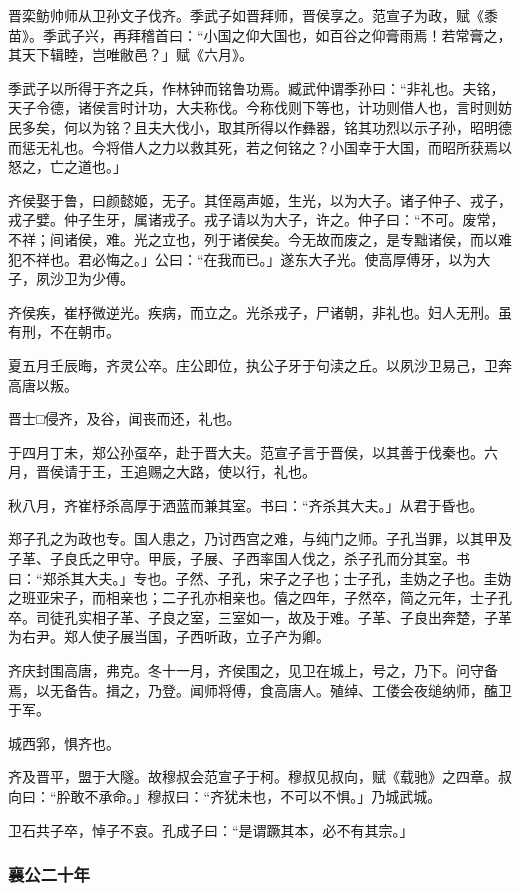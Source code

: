 \documentclass[]{article}
\begin{document}
晋栾鲂帅师从卫孙文子伐齐。季武子如晋拜师，晋侯享之。范宣子为政，赋《黍苗》。季武子兴，再拜稽首曰：``小国之仰大国也，如百谷之仰膏雨焉！若常膏之，其天下辑睦，岂唯敝邑？」赋《六月》。

季武子以所得于齐之兵，作林钟而铭鲁功焉。臧武仲谓季孙曰：``非礼也。夫铭，天子令德，诸侯言时计功，大夫称伐。今称伐则下等也，计功则借人也，言时则妨民多矣，何以为铭？且夫大伐小，取其所得以作彝器，铭其功烈以示子孙，昭明德而惩无礼也。今将借人之力以救其死，若之何铭之？小国幸于大国，而昭所获焉以怒之，亡之道也。」

齐侯娶于鲁，曰颜懿姬，无子。其侄鬲声姬，生光，以为大子。诸子仲子、戎子，戎子嬖。仲子生牙，属诸戎子。戎子请以为大子，许之。仲子曰：``不可。废常，不祥；间诸侯，难。光之立也，列于诸侯矣。今无故而废之，是专黜诸侯，而以难犯不祥也。君必悔之。」公曰：``在我而已。」遂东大子光。使高厚傅牙，以为大子，夙沙卫为少傅。

齐侯疾，崔杼微逆光。疾病，而立之。光杀戎子，尸诸朝，非礼也。妇人无刑。虽有刑，不在朝市。

夏五月壬辰晦，齐灵公卒。庄公即位，执公子牙于句渎之丘。以夙沙卫易己，卫奔高唐以叛。

晋士□侵齐，及谷，闻丧而还，礼也。

于四月丁未，郑公孙虿卒，赴于晋大夫。范宣子言于晋侯，以其善于伐秦也。六月，晋侯请于王，王追赐之大路，使以行，礼也。

秋八月，齐崔杼杀高厚于洒蓝而兼其室。书曰：``齐杀其大夫。」从君于昏也。

郑子孔之为政也专。国人患之，乃讨西宫之难，与纯门之师。子孔当罪，以其甲及子革、子良氏之甲守。甲辰，子展、子西率国人伐之，杀子孔而分其室。书曰：``郑杀其大夫。」专也。子然、子孔，宋子之子也；士子孔，圭妫之子也。圭妫之班亚宋子，而相亲也；二子孔亦相亲也。僖之四年，子然卒，简之元年，士子孔卒。司徒孔实相子革、子良之室，三室如一，故及于难。子革、子良出奔楚，子革为右尹。郑人使子展当国，子西听政，立子产为卿。

齐庆封围高唐，弗克。冬十一月，齐侯围之，见卫在城上，号之，乃下。问守备焉，以无备告。揖之，乃登。闻师将傅，食高唐人。殖绰、工偻会夜缒纳师，醢卫于军。

城西郛，惧齐也。

齐及晋平，盟于大隧。故穆叔会范宣子于柯。穆叔见叔向，赋《载驰》之四章。叔向曰：``肸敢不承命。」穆叔曰：``齐犹未也，不可以不惧。」乃城武城。

卫石共子卒，悼子不哀。孔成子曰：``是谓蹶其本，必不有其宗。」

\hypertarget{header-n2090}{%
\subsubsection{襄公二十年}\label{header-n2090}}
\end{document}
